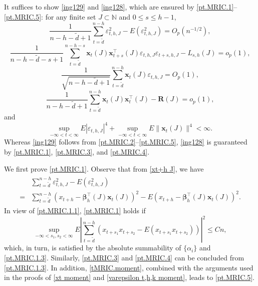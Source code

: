 \documentclass[ejsv2]{imsart}
\theoremstyle{plain}
\theoremstyle{definition}
\theoremstyle{remark}
\begin{document}
It suffices to show \eqref{ing129} and \eqref{ing128}, which are
ensured by \eqref{pt.MRIC.1}--\eqref{pt.MRIC.5}:
{for any finite set $J\subset\mathbb{N}$ and $0\leq s\leq h-1$,
\begin{equation}\label{pt.MRIC.1}
\frac{1}{n-h-\tilde{d}+1}\sum_{t=\tilde{d}}^{n-h}\varepsilon_{t,h,J}^2-E(\varepsilon_{t,h,J}^2)=O_p(n^{-1/2}),
\end{equation}
\begin{equation}\label{pt.MRIC.2}
\frac{1}{n-h-\tilde{d}-s+1}\sum_{t=\tilde{d}}^{n-h-s}\mathbf{x}_{t}(J)\mathbf{x}_{t+s}^\top(J)\varepsilon_{t,h,J}\varepsilon_{t+s,h,J}-L_{s,h}(J)=o_p(1),
\end{equation}
\begin{equation}\label{pt.MRIC.3}
\frac{1}{\sqrt{n-h-\tilde{d}+1}}\sum_{t=\tilde{d}}^{n-h}\mathbf{x}_{t}(J)\varepsilon_{t,h,J}=O_p(1),
\end{equation}
\begin{equation}\label{pt.MRIC.4}
\frac{1}{n-h-\tilde{d}+1}\sum_{t=\tilde{d}}^{n-h}\mathbf{x}_{t}(J)\mathbf{x}_{t}^\top(J)-\mathbf{R}(J)=o_p(1),
\end{equation}
and
\begin{equation}\label{pt.MRIC.5}
\sup\limits_{-\infty<t<\infty}E|\varepsilon_{t,h,J}|^4+\sup\limits_{-\infty<t<\infty}E\lVert\mathbf{x}_t(J)\rVert^4<\infty.
\end{equation}}
Whereas \eqref{ing129} follows from \eqref{pt.MRIC.2}--\eqref{pt.MRIC.5},
\eqref{ing128} is guaranteed by \eqref{pt.MRIC.1}, \eqref{pt.MRIC.3}, and \eqref{pt.MRIC.4}.

{We first prove \eqref{pt.MRIC.1}. Observe that from \eqref{xt+h J}, we have
\begin{align}\label{pt.MRIC.1.1}
\begin{split}
     &  \sum_{t=\tilde{d}}^{n-h}\varepsilon_{t,h,J}^2-E(\varepsilon_{t,h,J}^2) \\
   =  &  \sum_{t=\tilde{d}}^{n-h}(x_{t+h}-\bm{\beta}_h^\top(J)\mathbf{x}_{t}(J))^2-E(x_{t+h}-\bm{\beta}_h^\top(J)\mathbf{x}_{t}(J))^2.
     \end{split}
\end{align}
In view of \eqref{pt.MRIC.1.1}, \eqref{pt.MRIC.1} holds if
\begin{equation}\label{pt.MRIC.1.2}
\sup\limits_{-\infty<s_1,s_2<\infty}E|\sum_{t=\tilde{d}}^{n-h}(x_{t+s_1}x_{t+s_2}-E(x_{t+s_1}x_{t+s_2}))|^2\leq Cn,
\end{equation}
which, in turn, is satisfied by the absolute summability of $\{\alpha_i\}$ and \eqref{pt.MRIC.1.3}. Similarly, \eqref{pt.MRIC.3} and \eqref{pt.MRIC.4} can be concluded from \eqref{pt.MRIC.1.3}. In addition, \eqref{tMRIC.moment}, combined with the arguments used in the proofs of \eqref{xt moment} and \eqref{varepsilon t,h,k moment}, leads to \eqref{pt.MRIC.5}.}
\end{document}
